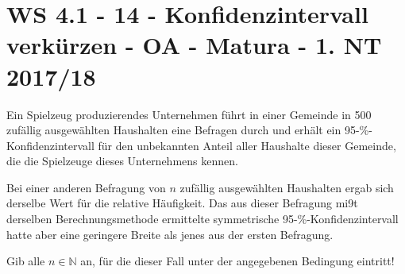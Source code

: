 \section{WS 4.1 - 14 - Konfidenzintervall verkürzen - OA - Matura - 1. NT 2017/18}

\begin{beispiel}[WS 4.1]{1}
Ein Spielzeug produzierendes Unternehmen führt in einer Gemeinde in 500 zufällig ausgewählten Haushalten eine Befragen durch und erhält ein 95-\%-Konfidenzintervall für den unbekannten Anteil aller Haushalte dieser Gemeinde, die die Spielzeuge dieses Unternehmens kennen.

Bei einer anderen Befragung von $n$ zufällig ausgewählten Haushalten ergab sich derselbe Wert für die relative Häufigkeit. Das aus dieser Befragung mi9t derselben Berechnungsmethode ermittelte symmetrische 95-\%-Konfidenzintervall hatte aber eine geringere Breite als jenes aus der ersten Befragung.

Gib alle $n\in\mathbb{N}$ an, für die dieser Fall unter der angegebenen Bedingung eintritt!

\end{beispiel}